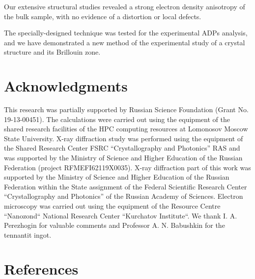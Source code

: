 \documentclass[preprint,review,12pt]{elsarticle}
\begin{document}
Our extensive structural studies revealed a strong electron density anisotropy of the bulk sample, with no evidence of a distortion or local defects.

The specially-designed  technique was tested for the experimental ADPs analysis, and we have demonstrated a new method of the experimental study of a crystal structure and its Brillouin zone.

\section{Acknowledgments}\label{sec:level1}
This research was partially supported by Russian Science Foundation (Grant No. 19-13-00451). The calculations were carried out using the equipment of the shared research facilities of the HPC computing resources at Lomonosov Moscow State University.
X-ray diffraction study was performed using the equipment of the Shared Research Center FSRC “Crystallography and Photonics” RAS and was supported by the Ministry of  Science and Higher Education of the Russian Federation (project RFMEFI62119X0035). X-ray diffraction part of this work was supported by the Ministry of Science and Higher Education of the Russian Federation within the State assignment  of the Federal Scientific Research Center “Crystallography and Photonics” of the Russian Academy of Sciences.
Electron microscopy was carried out using the equipment of the Resource Centre “Nanozond“
National Research Center “Kurchatov Institute“.
We thank I. A. Perezhogin for valuable comments and  Professor A. N. Babushkin for the tennantit ingot.


\section{References}\label{sec:level1}


\end{document}
